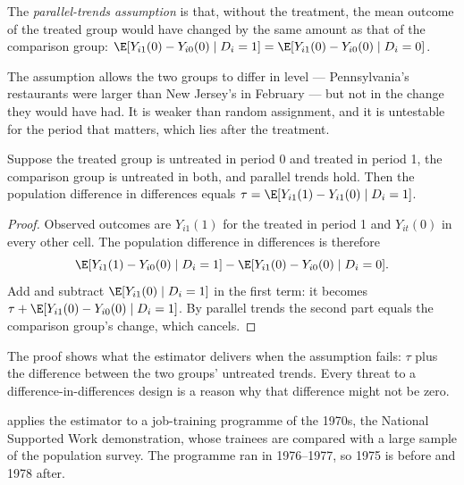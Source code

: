 \begin{definition}\label{def:b3:difference-in-differences:parallel-trends}
The \emph{parallel-trends assumption} is that, without the treatment, the
mean outcome of the treated group would have changed by the same amount as that
of the comparison group:
$\E[Y_{i1}(0) - Y_{i0}(0) \mid D_i = 1] = \E[Y_{i1}(0) - Y_{i0}(0) \mid D_i = 0]$.
\end{definition}

The assumption allows the two groups to differ in level --- Pennsylvania's
restaurants were larger than New Jersey's in February --- but not in the
change they would have had. It is weaker than random assignment, and it is
untestable for the period that matters, which lies after the treatment.

\begin{proposition}\label{prop:b3:difference-in-differences:att}
Suppose the treated group is untreated in period 0 and treated in period 1, the
comparison group is untreated in both, and parallel trends hold. Then the
population difference in differences equals $\tau = \E[Y_{i1}(1) - Y_{i1}(0) \mid
D_i = 1]$.
\end{proposition}

\begin{proof}
Observed outcomes are $Y_{i1}(1)$ for the treated in period 1 and $Y_{it}(0)$ in
every other cell. The population difference in differences is therefore
\[
  \E[Y_{i1}(1) - Y_{i0}(0) \mid D_i = 1] - \E[Y_{i1}(0) - Y_{i0}(0) \mid D_i = 0].
\]
Add and subtract $\E[Y_{i1}(0) \mid D_i = 1]$ in the first term:
it becomes $\tau + \E[Y_{i1}(0) - Y_{i0}(0) \mid D_i = 1]$. By parallel trends the
second part equals the comparison group's change, which cancels.
\end{proof}

The proof shows what the estimator delivers when the assumption fails: $\tau$
plus the difference between the two groups' untreated trends. Every threat to
a difference-in-differences design is a reason why that difference might not
be zero.

 applies the estimator to a
job-training programme of the 1970s, the National Supported Work
demonstration, whose trainees are compared with a large sample of the
population survey. The programme ran in 1976--1977, so 1975 is before and 1978
after.

\label{lst:b3:difference-in-differences:nsw}


